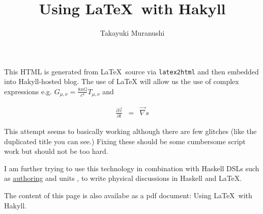 \documentclass{article}
\title{Using \LaTeX~with Hakyll}
\author{Takayuki Muranushi}
\begin{document}
\maketitle

This HTML is generated from \LaTeX~source via {\tt latex2html}
and then embedded into Hakyll-hosted blog. The use of LaTeX will allow us the use of
complex expressions e.g. $G_{\mu,\nu}=\frac{8\pi G}{c^4}T_{\mu,\nu}$ and

\begin{eqnarray}
\frac{\partial{\vec v}}{\partial t} &=& \vec \nabla s
\end{eqnarray}

This attempt seems to basically working although there are few
glitches (like the duplicated title you can see.) Fixing these should be some
cumbersome script work but should not be too hard.



I am further trying to use this technology in combination with Haskell
DSLs such as
\hyperlink{http://hackage.haskell.org/package/authoring}{authoring}
and units \cite{muranushi2014experience} , to write
physical discussions in Haskell and LaTeX.




The content of this page is also availabe as a pdf document: Using \LaTeX~with Hakyll.
\end{document}
